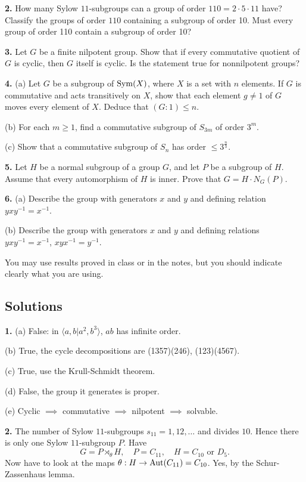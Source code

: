 \documentclass[a4paper,11pt,final,openany]{memoir}%
\theoremstyle{nonumberplain}
\begin{document}
\bigskip\noindent\textbf{2.} How many Sylow $11$-subgroups can a group of
order $110=2\cdot5\cdot11$ have? Classify the groups of order $110$ containing
a subgroup of order 10. Must every group of order 110 contain a subgroup of
order 10?

\bigskip\noindent\textbf{3.} Let $G$ be a finite nilpotent group. Show that if
every commutative quotient of $G$ is cyclic, then $G$ itself is cyclic. Is the
statement true for nonnilpotent groups?

\bigskip\noindent\textbf{4.} (a) Let $G$ be a subgroup of $\operatorname{Sym}(X)$, where $X$
is a set with $n$ elements. If $G$ is commutative and acts transitively on
$X$, show that each element $g\neq1$ of $G$ moves every element of $X$. Deduce
that $(G:1)\leq n$.

\noindent(b) For each $m\geq1$, find a commutative subgroup of $S_{3m}$ of
order $3^{m}$.

\noindent(c) Show that a commutative subgroup of $S_{n}$ has order
$\leq3^{\frac n3}$.

\bigskip\noindent\textbf{5.} Let $H$ be a normal subgroup of a group $G$, and
let $P$ be a subgroup of $H$. Assume that every automorphism of $H$ is inner.
Prove that $G=H\cdot N_{G}(P)$.

\bigskip\noindent\textbf{6.} (a) Describe the group with generators $x$ and
$y$ and defining relation $yxy^{-1}=x^{-1}$.

\noindent(b) Describe the group with generators $x$ and $y$ and defining
relations $yxy^{-1}=x^{-1}$, $xyx^{-1}=y^{-1}$.

\bigskip\noindent You may use results proved in class or in the notes, but you
should indicate clearly what you are using.

\clearpage


\subsection{Solutions}

\noindent\textbf{1.} (a) False: in $\langle a,b|a^{2},b^{3}\rangle$, $ab$ has
infinite order.

(b) True, the cycle decompositions are (1357)(246), (123)(4567).

(c) True, use the Krull-Schmidt theorem.

(d) False, the group it generates is proper.

(e) Cyclic $\implies$ commutative $\implies$ nilpotent $\implies$ solvable.

\bigskip\noindent\textbf{2.} The number of Sylow $11$-subgroups $s_{11}%
=1,12,\ldots$ and divides $10$. Hence there is only one Sylow $11$-subgroup
$P$. Have
\[
G=P\rtimes_{\theta}H,\quad P=C_{11},\quad H=C_{10}\text{ or }D_{5}.
\]
Now have to look at the maps $\theta:H\rightarrow\operatorname{Aut}(C_{11})=C_{10}$. Yes, by
the Schur-Zassenhaus lemma.
\end{document}

